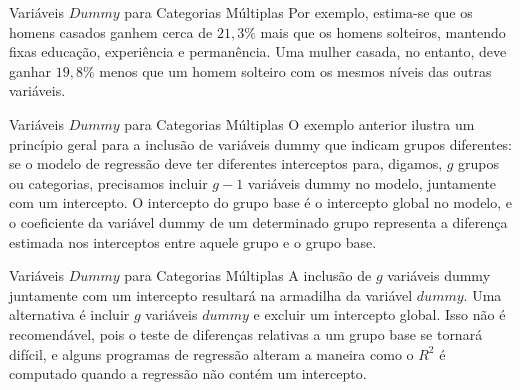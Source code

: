 \documentclass[t,14pt,mathserif]{beamer}
\begin{document}
{
\begin{frame}{Variáveis $Dummy$ para Categorias Múltiplas}
		\justifying
		\vfill
       Por exemplo, estima-se que os homens casados ganhem cerca de $21,3\%$ mais que os homens solteiros, mantendo fixas educação, experiência e permanência.
        \vfill
       Uma mulher casada, no entanto, deve ganhar $19,8\%$ menos que um homem solteiro com os mesmos níveis das outras variáveis.
       \vfill 
	    
       
\end{frame}
} 

{
\begin{frame}{Variáveis $Dummy$ para Categorias Múltiplas}
		\justifying
		\vfill
       O exemplo anterior ilustra um princípio geral para a inclusão de variáveis dummy que indicam grupos diferentes:  se o modelo de regressão deve ter diferentes interceptos para, digamos, $g$ grupos ou categorias, precisamos incluir $g - 1$ variáveis dummy no modelo, juntamente com um intercepto.
        \vfill
       O intercepto do grupo base é o intercepto global no modelo, e o coeficiente da variável dummy de um determinado grupo representa a diferença estimada nos interceptos entre aquele grupo e o grupo base.
       \vfill 
	    
       
\end{frame}
} 
 
{
\begin{frame}{Variáveis $Dummy$ para Categorias Múltiplas}
		\justifying
		\vfill
       A inclusão de $g$ variáveis dummy juntamente com um intercepto resultará na armadilha da variável $dummy$.
        \vfill
       Uma alternativa é incluir $g$ variáveis $dummy$ e excluir um intercepto global.
       \vfill 
	   Isso não é recomendável, pois o teste de diferenças relativas a um grupo base se tornará difícil, e alguns programas de regressão alteram a maneira como o $R^2$ é computado quando a regressão não contém um intercepto.
	   \vfill
       
\end{frame}
} 
\end{document}

